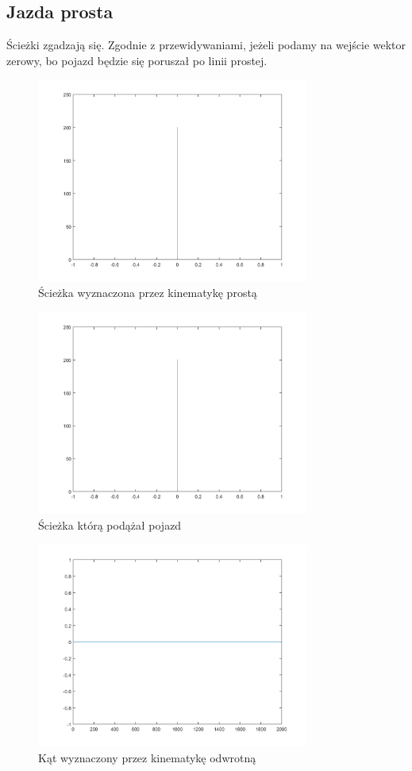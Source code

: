 \documentclass[a4paper, 12pt]{report}
\begin{document}
			\subsection{Jazda prosta}
				Ścieżki zgadzają się. Zgodnie z przewidywaniami, jeżeli podamy na wejście wektor zerowy, bo pojazd będzie się poruszał po linii prostej.
				\begin{figure}[H]
					\centering
					\includegraphics[width = 0.8\textwidth]{./AP/img/straight_in_1.png}
					\caption{Ścieżka wyznaczona przez kinematykę prostą}
				\end{figure}
				\begin{figure}[H]
					\centering
					\includegraphics[width = 0.8\textwidth]{./AP/img/straight_in_2.png}
					\caption{Ścieżka którą podążał pojazd}
				\end{figure}
				\begin{figure}[H]
					\centering
					\includegraphics[width = 0.8\textwidth]{./AP/img/straight_in_3.png}
					\caption{Kąt wyznaczony przez kinematykę odwrotną}
				\end{figure}
\end{document}
